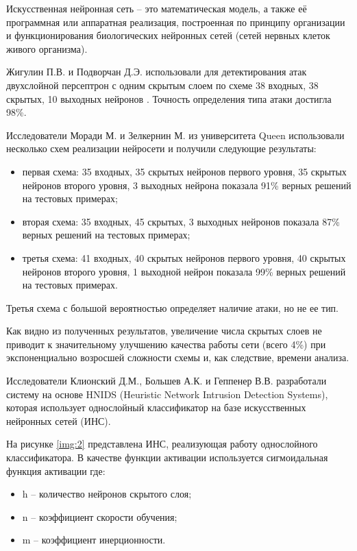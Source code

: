 Искусственная нейронная сеть – это математическая модель, а также её программная или аппаратная реализация, построенная по принципу организации и функционирования биологических нейронных сетей (сетей нервных клеток живого организма).\par 

Жигулин П.В. и Подворчан Д.Э. использовали для детектирования атак двухслойной персептрон с одним скрытым слоем по схеме 38 входных, 38 скрытых, 10 выходных нейронов . Точность определения типа атаки достигла 98\%. \par 

Исследователи Моради М. и Зелкернин М. из университета Queen использовали несколько схем реализации нейросети и получили следующие результаты:
\begin{itemize}
\item первая схема: 35 входных, 35 скрытых нейронов первого уровня, 35 скрытых нейронов второго уровня, 3 выходных нейрона показала 91\% верных решений на тестовых примерах;
\item вторая схема: 35 входных, 45 скрытых, 3 выходных нейронов показала 87\% верных решений на тестовых примерах;
\item третья схема: 41 входных, 40 скрытых нейронов первого уровня, 40 скрытых нейронов второго уровня, 1 выходной нейрон показала 99\% верных решений на тестовых примерах.
\end{itemize}

Третья схема с большой вероятностью определяет наличие атаки, но не ее тип.\par

Как видно из полученных результатов, увеличение числа скрытых слоев не приводит к значительному улучшению качества работы сети (всего 4\%) при экспоненциально возросшей сложности схемы и, как следствие, времени анализа.\par 

Исследователи Клионский Д.М., Большев А.К. и Геппенер В.В. разработали систему на основе HNIDS (Heuristic Network Intrusion Detection Systems), которая использует однослойный классификатор на базе искусственных нейронных сетей (ИНС).\par 

На рисунке \ref{img:2} представлена ИНС, реализующая работу однослойного классификатора. В качестве функции активации используется сигмоидальная функция активации где:
\begin{itemize}
\item h -- количество нейронов скрытого слоя;
\item n -- коэффициент скорости обучения;
\item m -- коэффициент инерционности.
\end{itemize}

